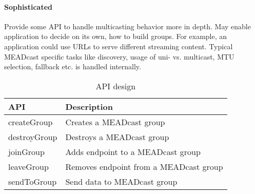 \paragraph{Sophisticated} %
\label{par:Sophisticated}
Provide some API to handle multicasting behavior more in depth.
May enable application to decide on its own, how to build groups.
For example, an application could use URLs to serve different streaming
content.
Typical MEADcast specific tasks like discovery, usage of uni- vs. multicast,
MTU selection, fallback etc. is handled internally.

\begin{table}[h]
\centering
\begin{tabular}{@{}ll@{}}
\toprule
\textbf{API} & \textbf{Description}                   \\ \midrule
createGroup  & Creates a MEADcast group               \\
destroyGroup & Destroys a MEADcast group              \\
joinGroup    & Adds endpoint to a MEADcast group      \\
leaveGroup   & Removes endpoint from a MEADcast group \\
sendToGroup  & Send data to MEADcast group            \\ \bottomrule
\end{tabular}
\caption{API design}
\label{tab:my-table}
\end{table}

